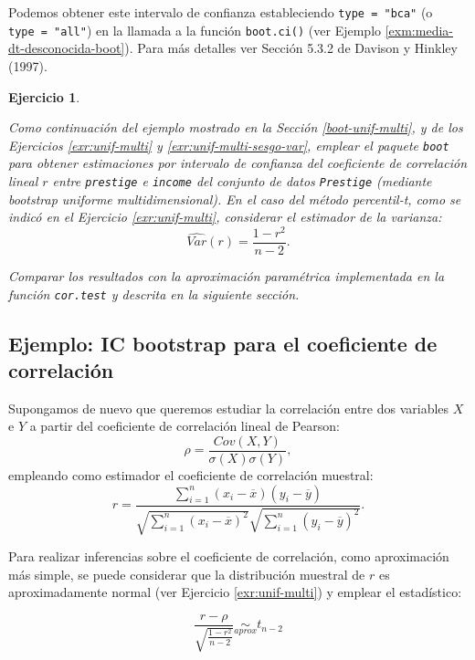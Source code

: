 \documentclass[
  10pt,
]{book}
\theoremstyle{break}
\newtheorem{exercise}{Ejercicio}[chapter]
\theoremstyle{nonumberplain}
\begin{document}
Podemos obtener este intervalo de confianza estableciendo \texttt{type\ =\ "bca"} (o \texttt{type\ =\ "all"}) en la llamada a la función \texttt{boot.ci()} (ver Ejemplo \ref{exm:media-dt-desconocida-boot}).
Para más detalles ver Sección 5.3.2 de Davison y Hinkley (1997).

\begin{exercise}
\protect\hypertarget{exr:boot-unif-multi-ic}{}\label{exr:boot-unif-multi-ic}

Como continuación del ejemplo mostrado en la Sección \ref{boot-unif-multi}, y de los Ejercicios \ref{exr:unif-multi} y \ref{exr:unif-multi-sesgo-var}, emplear el paquete \texttt{boot} para obtener estimaciones por intervalo de confianza del coeficiente de correlación lineal \(r\) entre \texttt{prestige} e \texttt{income} del conjunto de datos \texttt{Prestige} (mediante bootstrap uniforme multidimensional).
En el caso del método percentil-\emph{t}, como se indicó en el Ejercicio \ref{exr:unif-multi}, considerar el estimador de la varianza:
\[\widehat{Var}(r) = \frac{1 - r^2}{n - 2}.\]

Comparar los resultados con la aproximación paramétrica implementada en la función \texttt{cor.test} y descrita en la siguiente sección.
\end{exercise}

\hypertarget{icboot-trans}{%
\subsection{Ejemplo: IC bootstrap para el coeficiente de correlación}\label{icboot-trans}}

Supongamos de nuevo que queremos estudiar la correlación entre dos variables \(X\) e \(Y\) a partir del coeficiente de correlación lineal de Pearson:
\[\rho =\frac{ Cov \left( X, Y \right) }
{ \sigma \left( X \right) \sigma \left( Y \right) },\]
empleando como estimador el coeficiente de correlación muestral:
\[r=\frac{\sum_{i=1}^{n}(x_i-\overline{x})(y_i-\overline{y})}
{\sqrt{ \sum_{i=1}^{n}(x_i-\overline{x})^{2}} 
\sqrt{\sum_{i=1}^{n}(y_i-\overline{y})^{2}}}.\]

Para realizar inferencias sobre el coeficiente de correlación, como aproximación más simple, se puede considerar que la distribución muestral de \(r\) es aproximadamente normal (ver Ejercicio \ref{exr:unif-multi}) y emplear el estadístico:

\begin{equation} 
\frac{r -\rho}{\sqrt{\frac{1 - r^2}{n - 2}}} \underset{aprox}{\sim } t_{n-2}
\label{eq:cor-t}
\end{equation}
\end{document}
